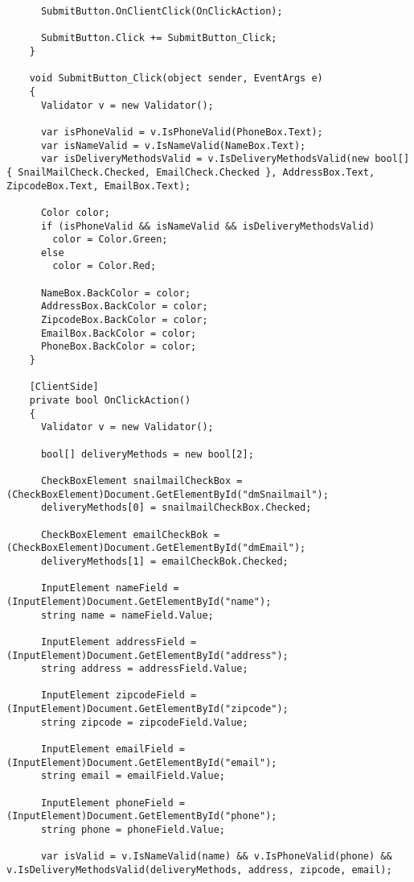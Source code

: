 \begin{appendices}
\begin{lstlisting}
      SubmitButton.OnClientClick(OnClickAction);

      SubmitButton.Click += SubmitButton_Click;
    }

    void SubmitButton_Click(object sender, EventArgs e)
    {
      Validator v = new Validator();

      var isPhoneValid = v.IsPhoneValid(PhoneBox.Text);
      var isNameValid = v.IsNameValid(NameBox.Text);
      var isDeliveryMethodsValid = v.IsDeliveryMethodsValid(new bool[] { SnailMailCheck.Checked, EmailCheck.Checked }, AddressBox.Text, ZipcodeBox.Text, EmailBox.Text);

      Color color;
      if (isPhoneValid && isNameValid && isDeliveryMethodsValid)
        color = Color.Green;
      else
        color = Color.Red;
      
      NameBox.BackColor = color;
      AddressBox.BackColor = color;
      ZipcodeBox.BackColor = color;
      EmailBox.BackColor = color;
      PhoneBox.BackColor = color;
    }

    [ClientSide]
    private bool OnClickAction()
    {
      Validator v = new Validator();

      bool[] deliveryMethods = new bool[2];
      
      CheckBoxElement snailmailCheckBox = (CheckBoxElement)Document.GetElementById("dmSnailmail");
      deliveryMethods[0] = snailmailCheckBox.Checked;

      CheckBoxElement emailCheckBok = (CheckBoxElement)Document.GetElementById("dmEmail");
      deliveryMethods[1] = emailCheckBok.Checked;

      InputElement nameField = (InputElement)Document.GetElementById("name");
      string name = nameField.Value;

      InputElement addressField = (InputElement)Document.GetElementById("address");
      string address = addressField.Value;
      
      InputElement zipcodeField = (InputElement)Document.GetElementById("zipcode");
      string zipcode = zipcodeField.Value;
      
      InputElement emailField = (InputElement)Document.GetElementById("email");
      string email = emailField.Value;

      InputElement phoneField = (InputElement)Document.GetElementById("phone");
      string phone = phoneField.Value;

      var isValid = v.IsNameValid(name) && v.IsPhoneValid(phone) && v.IsDeliveryMethodsValid(deliveryMethods, address, zipcode, email);


\end{lstlisting}
\end{appendices}
